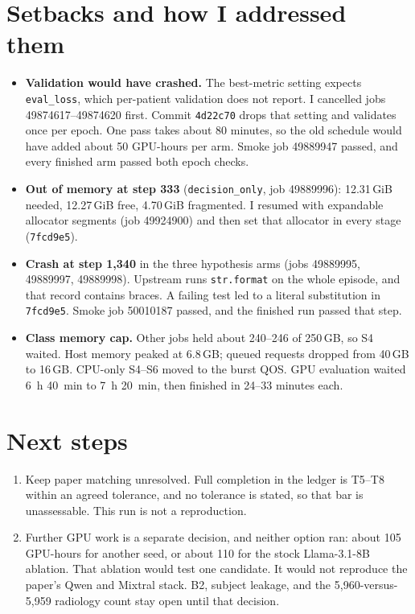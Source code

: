 \documentclass[11pt,letterpaper]{article}
\begin{document}
\section{Setbacks and how I addressed them}
\begin{itemize}
  \item \textbf{Validation would have crashed.} The best-metric setting expects \texttt{eval\_loss}, which per-patient validation does not report. I cancelled jobs 49874617--49874620 first. Commit \texttt{4d22c70} drops that setting and validates once per epoch. One pass takes about 80 minutes, so the old schedule would have added about 50 GPU-hours per arm. Smoke job 49889947 passed, and every finished arm passed both epoch checks.
  \item \textbf{Out of memory at step 333} (\texttt{decision\_only}, job 49889996): 12.31\,GiB needed, 12.27\,GiB free, 4.70\,GiB fragmented. I resumed with expandable allocator segments (job 49924900) and then set that allocator in every stage (\texttt{7fcd9e5}).
  \item \textbf{Crash at step 1,340} in the three hypothesis arms (jobs 49889995, 49889997, 49889998). Upstream runs \texttt{str.format} on the whole episode, and that record contains braces. A failing test led to a literal substitution in \texttt{7fcd9e5}. Smoke job 50010187 passed, and the finished run passed that step.
  \item \textbf{Class memory cap.} Other jobs held about 240--246 of 250\,GB, so S4 waited. Host memory peaked at 6.8\,GB; queued requests dropped from 40\,GB to 16\,GB. CPU-only S4--S6 moved to the burst QOS. GPU evaluation waited 6~h 40~min to 7~h 20~min, then finished in 24--33 minutes each.
\end{itemize}

\section{Next steps}
\begin{enumerate}
  \item Keep paper matching unresolved. Full completion in the ledger is T5--T8 within an agreed tolerance, and no tolerance is stated, so that bar is unassessable. This run is not a reproduction.
  \item Further GPU work is a separate decision, and neither option ran: about 105 GPU-hours for another seed, or about 110 for the stock Llama-3.1-8B ablation. That ablation would test one candidate. It would not reproduce the paper's Qwen and Mixtral stack. B2, subject leakage, and the 5,960-versus-5,959 radiology count stay open until that decision.
\end{enumerate}
\end{document}
